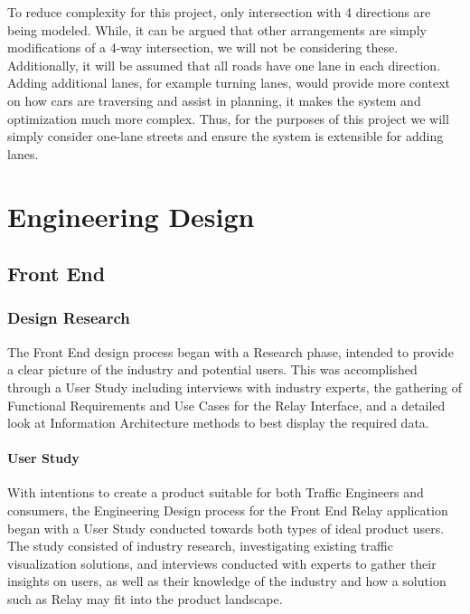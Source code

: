 \documentclass{report}
\begin{document}
To reduce complexity for this project, only intersection with 4 directions are being modeled. 
While, it can be argued that other arrangements are simply modifications of a 4-way intersection, we will not be considering these. 
Additionally, it will be assumed that all roads have one lane in each direction. 
Adding additional lanes, for example turning lanes, would provide more context on how cars are traversing and assist in planning, it makes the system and optimization much more complex. 
Thus, for the purposes of this project we will simply consider one-lane streets and ensure the system is extensible for adding lanes.


\newpage
\chapter{Engineering Design}

\section{Front End}

\subsection{Design Research}
The Front End design process began with a Research phase, intended to provide a clear picture of the industry and potential users.
This was accomplished through a User Study including interviews with industry experts, the gathering of Functional Requirements and Use Cases for the Relay Interface, and a detailed look at Information Architecture methods to best display the required data.

\subsubsection{User Study}
With intentions to create a product suitable for both Traffic Engineers and consumers, the Engineering Design process for the Front End Relay application began with a User Study conducted towards both types of ideal product users.
The study consisted of industry research, investigating existing traffic visualization solutions, and interviews conducted with experts to gather their insights on users, as well as their knowledge of the industry and how a solution such as Relay may fit into the product landscape. 
\end{document}
